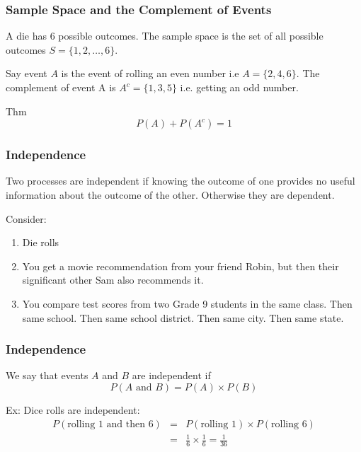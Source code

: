 \documentclass[handout]{beamer}
\newcommand{\blue}[1]{\textcolor{blue2}{#1}}
\begin{document}
\begin{frame}
\frametitle{Sample Space and the Complement of Events}
A die has 6 possible outcomes.  The \blue{sample space} is the set of all possible outcomes $S = \{1, 2, \ldots, 6\}$.  

\pause \vspace{0.75cm}
Say event $A$ is the event of rolling an even number i.e $A=\{2, 4, 6\}$.  The \blue{complement of event} A is $A^c=\{1, 3, 5\}$ i.e. getting an odd number.  

\pause \vspace{0.75cm}
Thm
\[
P(A) + P(A^c) = 1
\]

\end{frame}


\begin{frame}
\frametitle{Independence}
Two processes are \blue{independent} if knowing the outcome of one provides no useful information about the outcome of the other.  Otherwise they are dependent.

\vspace{0.5cm}

\pause Consider:
\begin{enumerate}
\pause \item Die rolls
\pause \item You get a movie recommendation from your friend Robin, but then their significant other Sam also recommends it.  
\pause \item You compare test scores from two Grade 9 students in the same class.  Then same school.  Then same school district.  Then same city.  Then same state.
\end{enumerate}

\end{frame}


\begin{frame}
\frametitle{Independence}
We say that events $A$ and $B$ are \blue{independent} if
\[
P(A \mbox{ and } B) = P(A) \times P(B)
\]

\vspace{0.25cm}

\pause Ex: Dice rolls are independent:
\begin{eqnarray*}
P(\mbox{rolling 1 and then 6}) &=& P(\mbox{rolling 1}) \times P(\mbox{rolling 6})\\
&=& \frac{1}{6}\times\frac{1}{6} = \frac{1}{36}
\end{eqnarray*}

\end{frame}
\end{document}
